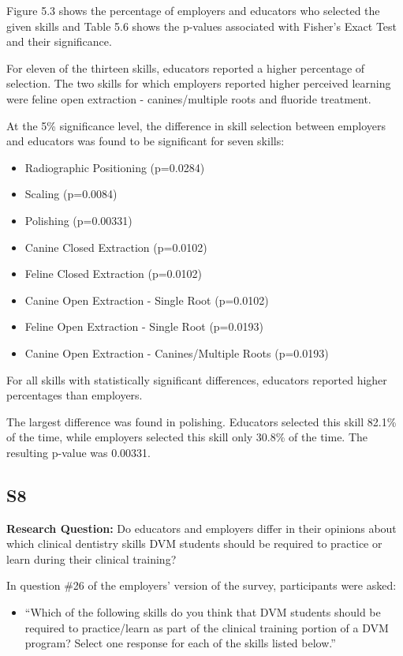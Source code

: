 \documentclass[
  12pt,
  letterpaper,
  DIV=11,
  numbers=noendperiod]{scrartcl}
\providecommand{\tightlist}{%
  \setlength{\itemsep}{0pt}\setlength{\parskip}{0pt}}\usepackage{longtable,booktabs,array}
\numberwithin{figure}{section}
\numberwithin{table}{section}
\begin{document}
Figure 5.3 shows the percentage of employers and educators who selected
the given skills and Table 5.6 shows the p-values associated with
Fisher's Exact Test and their significance.

For eleven of the thirteen skills, educators reported a higher
percentage of selection. The two skills for which employers reported
higher perceived learning were feline open extraction - canines/multiple
roots and fluoride treatment.

At the 5\% significance level, the difference in skill selection between
employers and educators was found to be significant for seven skills:

\begin{itemize}
\tightlist
\item
  Radiographic Positioning (p=0.0284)
\item
  Scaling (p=0.0084)
\item
  Polishing (p=0.00331)
\item
  Canine Closed Extraction (p=0.0102)
\item
  Feline Closed Extraction (p=0.0102)
\item
  Canine Open Extraction - Single Root (p=0.0102)
\item
  Feline Open Extraction - Single Root (p=0.0193)
\item
  Canine Open Extraction - Canines/Multiple Roots (p=0.0193)
\end{itemize}

For all skills with statistically significant differences, educators
reported higher percentages than employers.

The largest difference was found in polishing. Educators selected this
skill 82.1\% of the time, while employers selected this skill only
30.8\% of the time. The resulting p-value was 0.00331.

\subsection{S8}\label{s8}

\textbf{Research Question:} Do educators and employers differ in their
opinions about which clinical dentistry skills DVM students should be
required to practice or learn during their clinical training?

In question \#26 of the employers' version of the survey, participants
were asked:

\begin{itemize}
\tightlist
\item
  ``Which of the following skills do you think that DVM students should
  be required to practice/learn as part of the clinical training portion
  of a DVM program? Select one response for each of the skills listed
  below.''
\end{itemize}
\end{document}
